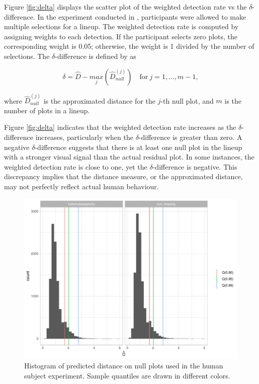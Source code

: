 \documentclass[]{interact}
\theoremstyle{plain}%
\theoremstyle{definition}
\theoremstyle{remark}
\begin{document}
Figure \ref{fig:delta} displays the scatter plot of the weighted
detection rate vs the \(\delta\)-difference. In the experiment conducted
in \citet{li2023plot}, participants were allowed to make multiple
selections for a lineup. The weighted detection rate is computed by
assigning weights to each detection. If the participant selects zero
plots, the corresponding weight is 0.05; otherwise, the weight is 1
divided by the number of selections. The \(\delta\)-difference is
defined by \citet{chowdhury2018measuring} as

\begin{equation}
\delta = \hat{D} - \underset{j}{max}\left(\hat{D}_{null}^{(j)}\right) \quad \text{for}~j = 1,...,m-1,
\end{equation}

\noindent where \(\hat{D}_{null}^{(j)}\) is the approximated distance
for the \(j\)-th null plot, and \(m\) is the number of plots in a
lineup.

Figure \ref{fig:delta} indicates that the weighted detection rate
increases as the \(\delta\)-difference increases, particularly when the
\(\delta\)-difference is greater than zero. A negative
\(\delta\)-difference suggests that there is at least one null plot in
the lineup with a stronger visual signal than the actual residual plot.
In some instances, the weighted detection rate is close to one, yet the
\(\delta\)-difference is negative. This discrepancy implies that the
distance measure, or the approximated distance, may not perfectly
reflect actual human behaviour.

\begin{figure}[!h]

{\centering \includegraphics[width=1\linewidth]{paper_files/figure-latex/hist-null-human-1} 

}

\caption{Histogram of predicted distance on null plots used in the human subject experiment. Sample quantiles are drawn in different colors.}\label{fig:hist-null-human}
\end{figure}
\end{document}
